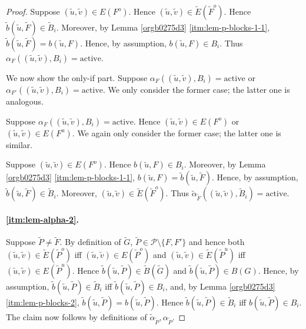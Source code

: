 \documentclass[fontsize=11pt,paper=a4]{book}
\begin{document}
\begin{proof}
Suppose \((\tilde{u},\tilde{v})\in E(F^o)\).
Hence \((\tilde{u},\tilde{v})\in\tilde{E}(\tilde{F}^o)\).
Hence \(\tilde{b}(\tilde{u},\tilde{F})\in\tilde{B}_i\).
Moreover, by Lemma \ref{orgb0275d3} \ref{itm:lem-p-blocks-1-1}, \(\tilde{b}(\tilde{u},\tilde{F})=b(\tilde{u},F)\).
Hence, by assumption, \(b(\tilde{u},F)\in B_i\).
Thus \(\alpha_F((\tilde{u},\tilde{v}),B_i)=\mathrm{active}\).

We now show the only-if part.
Suppose \(\alpha_F((\tilde{u},\tilde{v}),B_i)=\mathrm{active}\) or \(\alpha_{F'}((\tilde{u},\tilde{v}),B_i)=\mathrm{active}\).
We only consider the former case; the latter one is analogous.

Suppose \(\alpha_F((\tilde{u},\tilde{v}),B_i)=\mathrm{active}\).
Hence \((\tilde{u},\tilde{v})\in E(F^o)\) or \((\tilde{u},\tilde{v})\in E(F^u)\).
We again only consider the former case; the latter one is similar.

Suppose \((\tilde{u},\tilde{v})\in E(F^o)\).
Hence \(b(\tilde{u},F)\in B_i\).
Moreover, by Lemma \ref{orgb0275d3} \ref{itm:lem-p-blocks-1-1}, \(b(\tilde{u},F)=\tilde{b}(\tilde{u},\tilde{F})\).
Hence, by assumption, \(\tilde{b}(\tilde{u},\tilde{F})\in\tilde{B}_i\).
Moreover, \((\tilde{u},\tilde{v})\in\tilde{E}(\tilde{F}^o)\).
Thus \(\tilde{\alpha}_{\tilde{F}}((\tilde{u},\tilde{v}),\tilde{B}_i)=\mathrm{active}\).

\paragraph{\ref{itm:lem-alpha-2}.}
Suppose \(\tilde{P}\neq\tilde{F}\).
By definition of \(\tilde{G}\), \(\tilde{P}\in\mathcal{P}\setminus\{F,F'\}\) and hence both \((\tilde{u},\tilde{v})\in\tilde{E}(\tilde{P}^o)\) iff \((\tilde{u},\tilde{v})\in E(\tilde{P}^o)\) and \((\tilde{u},\tilde{v})\in\tilde{E}(\tilde{P}^u)\) iff \((\tilde{u},\tilde{v})\in E(\tilde{P}^u)\).
Hence \(\tilde{b}(\tilde{u},\tilde{P})\in\tilde{B}(\tilde{G})\) and \(\tilde{b}(\tilde{u},\tilde{P})\in B(G)\).
Hence, by assumption, \(\tilde{b}(\tilde{u},\tilde{P})\in\tilde{B}_i\) iff \(\tilde{b}(\tilde{u},\tilde{P})\in B_i\), and, by Lemma \ref{orgb0275d3} \ref{itm:lem-p-blocks-2}, \(\tilde{b}(\tilde{u},\tilde{P})=b(\tilde{u},\tilde{P})\).
Hence \(\tilde{b}(\tilde{u},\tilde{P})\in\tilde{B}_i\) iff \(b(\tilde{u},\tilde{P})\in B_i\).
The claim now follows by definitions of \(\tilde{\alpha}_{\tilde{P}},\alpha_{\tilde{P}}\).
\end{proof}
\end{document}
